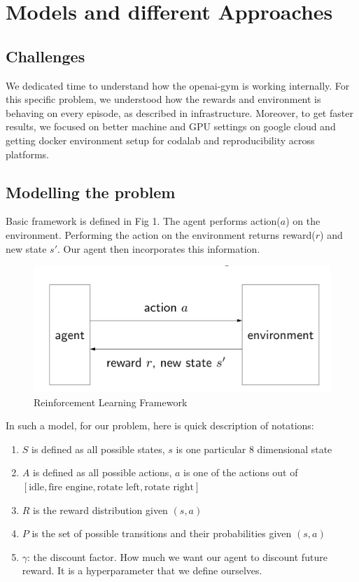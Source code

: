 \section{Models and different Approaches}
\subsection{Challenges}

We dedicated time to understand how the openai-gym is working internally. For this specific problem, we understood how the rewards and environment is behaving on every episode, as described in infrastructure. Moreover, to get faster results, we focused on better machine and GPU settings on google cloud and getting docker environment setup for codalab and reproducibility across platforms.

\subsection{Modelling the problem}

Basic framework is defined in Fig 1. The agent performs action($a$) on the environment. Performing the action on the environment returns reward($r$) and new state $s'$. Our agent then incorporates this information.

\begin{figure}[!ht]
\centering
\includegraphics[scale=0.25,width=0.25\columnwidth]{reinforcement_framework.png}%
\caption{ Reinforcement Learning Framework}%
\label{fig:Visualization}%
\end{figure}

In such a model, for our problem, here is quick description of notations:
\begin{enumerate}
\item $S$ is defined as all possible states, $s$ is one particular 8 dimensional state
\item $A$ is defined as all possible actions, $a$ is one of the actions out of $[\text{idle}, \text{fire engine}, \text{rotate left}, \text{rotate right}]$
\item $R$ is the reward distribution given $(s, a)$
\item $P$ is the set of possible transitions and their probabilities given $(s, a)$
\item $\gamma$: the discount factor. How much we want our agent to discount future reward. It is a hyperparameter that we define ourselves.
\end{enumerate}


